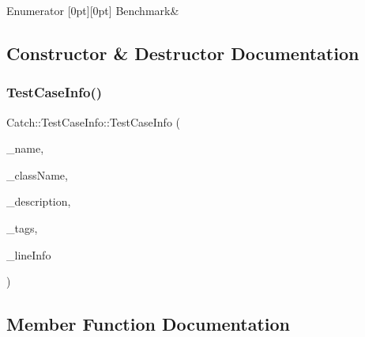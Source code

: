 \begin{DoxyEnumFields}{Enumerator}
[0pt][0pt]{}\mbox{\label{struct_catch_1_1_test_case_info_a39b232f74b4a7a6f2183b96759027eacad0e25e337246ae34d555fe53baf81c16}} 
Benchmark&\\
\hline

\end{DoxyEnumFields}


\subsection{Constructor \& Destructor Documentation}
\mbox{\label{struct_catch_1_1_test_case_info_ad1a6b08b5a83d1c5eb4596b727b5305f}} 
\subsubsection{\texorpdfstring{TestCaseInfo()}{TestCaseInfo()}}
{\footnotesize\ttfamily Catch\+::\+Test\+Case\+Info\+::\+Test\+Case\+Info (\begin{DoxyParamCaption}\item[{std\+::string const \&}]{\+\_\+name,  }\item[{std\+::string const \&}]{\+\_\+class\+Name,  }\item[{std\+::string const \&}]{\+\_\+description,  }\item[{std\+::vector$<$ std\+::string $>$ const \&}]{\+\_\+tags,  }\item[{\mbox{\hyperlink{struct_catch_1_1_source_line_info}{Source\+Line\+Info}} const \&}]{\+\_\+line\+Info }\end{DoxyParamCaption})}



\subsection{Member Function Documentation}
\mbox{\label{struct_catch_1_1_test_case_info_abe33d81233230cdae8afa714688e905b}} 
